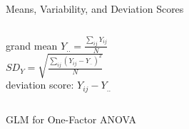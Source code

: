 \documentclass[presentation]{beamer}
\begin{document}
\begin{frame}[label={sec:orgdc8b882}]{Means, Variability, and Deviation Scores}
\begin{columns}
\begin{column}{.7\columnwidth}
grand mean $Y_{..} = \frac{\sum_{ij} Y_{ij}}{N}$\\[6pt]
$SD_Y = \sqrt{\frac{\sum_{ij} \left(Y_{ij}-Y_{..}\right)^2}{N}}$\\[6pt]
deviation score: $Y_{ij} - Y_{..}$
\end{column}
\end{columns}
\end{frame}

\begin{frame}[label={sec:orga7d2341}]{GLM for One-Factor ANOVA}
\begin{columns}
\begin{column}{.3\columnwidth}

\end{column}
\end{columns}
\end{frame}
\end{document}
